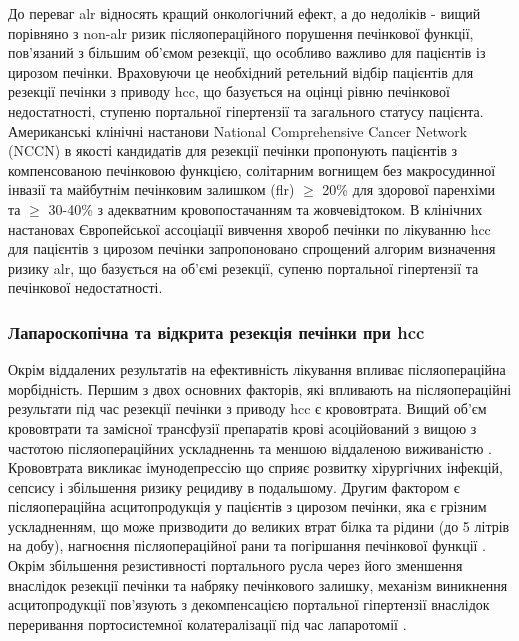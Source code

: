 \begin{refsection}
До переваг \acrshort{alr} відносять кращий онкологічний ефект, а до недоліків - вищий порівняно з \acrshort{non-alr} ризик післяопераційного порушення печінкової функції, пов'язаний з більшим об'ємом резекції, що особливо важливо для пацієнтів із цирозом печінки. Враховуючи це необхідний ретельний відбір пацієнтів для резекції печінки з приводу \acrshort{hcc}, що базується на оцінці рівню печінкової недостатності, ступеню портальної гіпертензії та загального статусу пацієнта. Американські клінічні настанови National Comprehensive Cancer Network (\acrshort{NCCN}) в якості кандидатів для резекції печінки пропонують пацієнтів з компенсованою печінковою функцією, солітарним вогнищем без макросудинної інвазії та майбутнім печінковим залишком (\acrshort{flr}) $\geq$ 20\% для здорової паренхіми та $\geq$ 30-40\% з адекватним кровопостачанням та жовчевідтоком. В клінічних настановах Європейської ассоціації вивчення хвороб печінки по лікуванню \acrshort{hcc} \cite{Galle2018a} для пацієнтів з цирозом печінки запропоновано спрощений алгорим визначення ризику \acrshort{alr}, що базується на об'ємі резекції, супеню портальної гіпертензії та печінкової недостатності. 

\subsubsection{Лапароскопічна та відкрита резекція печінки при \acrshort{hcc}} 
Окрім віддалених результатів на ефективність лікування впливає післяопераційна морбідність. Першим з двох основних факторів, які впливають на післяопераційні результати під час резекції печінки з приводу \acrshort{hcc} є крововтрата. Вищий об'єм крововтрати та замісної трансфузії препаратів крові асоційований з вищою з частотою післяопераційних ускладненнь та меншою віддаленою виживаністю \cite{DeBoer2007, Romano2012}. Крововтрата викликає імунодепрессію що сприяє розвитку хірургічних інфекцій, сепсису і збільшення ризику рецидиву в подальшому. Другим фактором є післяопераційна асцитопродукція у пацієнтів з цирозом печінки, яка є грізним ускладненням, що може призводити до великих втрат білка та рідини (до 5 літрів на добу), нагноєння післяопераційної рани та погіршання печінкової функції \cite{Ishii2014}. Окрім збільшення резистивності портального русла через його зменшення внаслідок резекції печінки та набряку печінкового залишку, механізм виникнення асцитопродукції пов'язують з декомпенсацією портальної гіпертензії внаслідок переривання портосистемної колатералізації під час лапаротомії \cite{Kanazawa2013}. 


\end{refsection}
